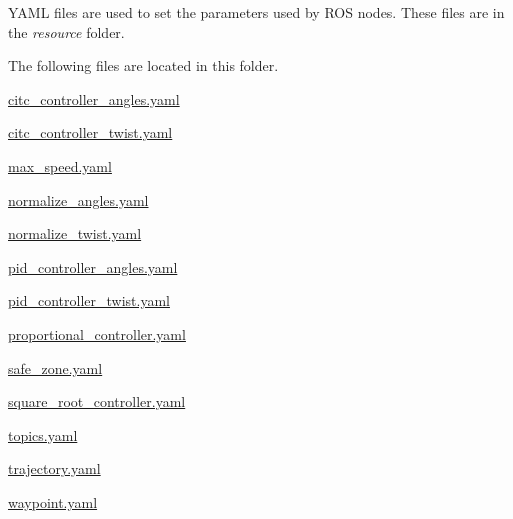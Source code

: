 YAML files are used to set the parameters used by ROS nodes. These files are in the {\itshape resource} folder.

The following files are located in this folder.


\begin{DoxyItemize}
\item \mbox{\hyperlink{citc__controller__angles_8yaml}{citc\+\_\+controller\+\_\+angles.\+yaml}}
\item \mbox{\hyperlink{citc__controller__twist_8yaml}{citc\+\_\+controller\+\_\+twist.\+yaml}}
\item \mbox{\hyperlink{max__speed_8yaml}{max\+\_\+speed.\+yaml}}
\item \mbox{\hyperlink{normalize__angles_8yaml}{normalize\+\_\+angles.\+yaml}}
\item \mbox{\hyperlink{normalize__twist_8yaml}{normalize\+\_\+twist.\+yaml}}
\item \mbox{\hyperlink{pid__controller__angles_8yaml}{pid\+\_\+controller\+\_\+angles.\+yaml}}
\item \mbox{\hyperlink{pid__controller__twist_8yaml}{pid\+\_\+controller\+\_\+twist.\+yaml}}
\item \mbox{\hyperlink{proportional__controller_8yaml}{proportional\+\_\+controller.\+yaml}}
\item \mbox{\hyperlink{safe__zone_8yaml}{safe\+\_\+zone.\+yaml}}
\item \mbox{\hyperlink{square__root__controller_8yaml}{square\+\_\+root\+\_\+controller.\+yaml}}
\item \mbox{\hyperlink{topics_8yaml}{topics.\+yaml}}
\item \mbox{\hyperlink{trajectory_8yaml}{trajectory.\+yaml}}
\item \mbox{\hyperlink{waypoint_8yaml}{waypoint.\+yaml}} 
\end{DoxyItemize}